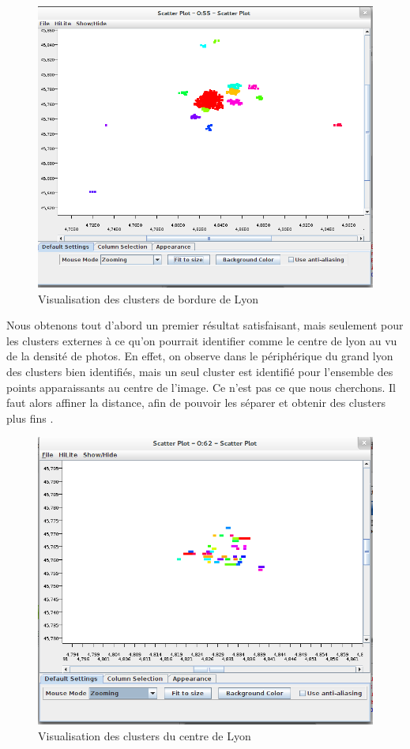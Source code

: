 \begin{figure}[H]
    \centering
    \includegraphics[width=\linewidth]{img/dbscan_50.png}
    \caption{Visualisation des clusters de bordure de Lyon}
\end{figure}

Nous obtenons tout d'abord un premier résultat satisfaisant, mais seulement pour les clusters externes à ce qu'on pourrait identifier comme le centre de lyon au vu de la densité de photos. En effet, on observe dans le périphérique du grand lyon des clusters bien identifiés, mais un seul cluster est identifié pour l'ensemble des points apparaissants au centre de l'image. Ce n'est pas ce que nous cherchons. Il faut alors affiner la distance, afin de pouvoir les séparer et obtenir des clusters plus fins .

\begin{figure}[H]
    \centering
    \includegraphics[width=\linewidth]{img/dbscan_21.png}
    \caption{Visualisation des clusters du centre de Lyon}
\end{figure}


